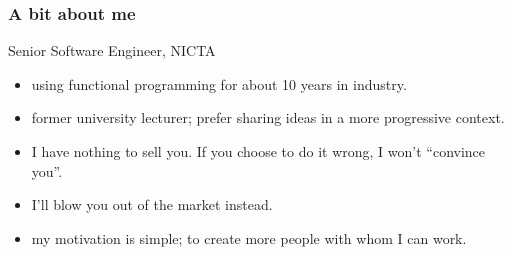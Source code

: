 \begin{frame}
\frametitle{A bit about me}
\begin{block}{Senior Software Engineer, NICTA}
\begin{itemize}
\item<1-> using functional programming for about 10 years in industry.
\item<2-> former university lecturer; prefer sharing ideas in a more progressive context.
\item<3-> I have nothing to sell you. If you choose to do it wrong, I won't ``convince you''. 
\item<4-> I'll blow you out of the market instead.
\item<5-> my motivation is simple; to create more people with whom I can work.
\end{itemize}
\end{block}
\end{frame}
